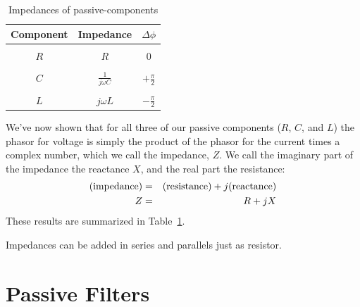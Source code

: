 \documentclass[12pt,oneside]{book}
\begin{document}
\begin{table}
\caption{Impedances of passive-components}
\label{tbl:impedance}
\begin{center}
\begin{tabular}{ccc}
Component & Impedance & $\Delta \phi$ \\
\hline
\\
$R$ & $R$ & 0 \\
\\
$C$ & $\displaystyle \frac{1}{j \omega C}$ & $\displaystyle + \frac{\pi}{2}$ \\
\\
$L$ & $j \omega L$ & $\displaystyle -\frac{\pi}{2}$ \\

\end{tabular}
\end{center}
\end{table}

We've now shown that for all three of our passive components ($R$, $C$, and $L$) the phasor for voltage is simply the product of the phasor for the current times a complex number, which we call the impedance, $Z$.  We call the imaginary part of the impedance the reactance $X$, and the real part the resistance:
\begin{eqnarray*}
({\rm impedance}) &=& ({\rm resistance}) + j ({\rm reactance} ) \\
Z &=& R + j X \\
\end{eqnarray*}
These results are summarized in Table~\ref{tbl:impedance}.  

Impedances can be added in series and parallels just as resistor.

\section{Passive Filters}
\end{document}
